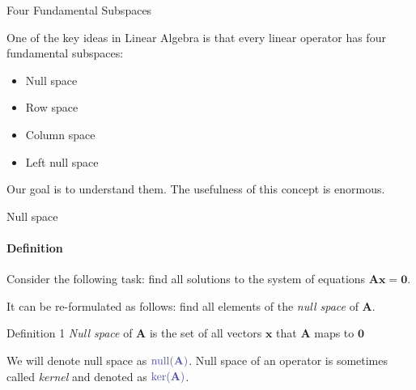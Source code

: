 \documentclass{beamer}
\begin{document}
\begin{frame}{Four Fundamental Subspaces}
	\begin{flushleft}
		
		One of the key ideas in Linear Algebra is that every linear operator has four fundamental subspaces:
		
		\begin{itemize}
			\item Null space
			\item Row space
			\item Column space
			\item Left null space
		\end{itemize}
		
		\bigskip
		
		Our goal is to understand them. The usefulness of this concept is enormous.
		
	\end{flushleft}
\end{frame}

\begin{frame}{Null space}
	\framesubtitle{Definition}
	\begin{flushleft}
		
		Consider the following task: find all solutions to the system of equations $\mathbf{A} \mathbf{x} = \mathbf{0}$.
		
		\bigskip
		
		It can be re-formulated as follows: find all elements of the \emph{null space} of $\mathbf{A}$.
		
		\begin{block}{Definition 1}
			\emph{Null space} of $\mathbf{A}$ is the set of all vectors $\mathbf{x}$ that $\mathbf{A}$ maps to $\mathbf{0}$
		\end{block}
		
		\bigskip
		
		We will denote null space as $\textcolor{mydarkgray}{\text{null}(\mathbf{A})}$. Null space of an operator is sometimes called \emph{kernel} and denoted as $\textcolor{mydarkgray}{\text{ker}(\mathbf{A})}$.
		
	\end{flushleft}
\end{frame}
\end{document}
